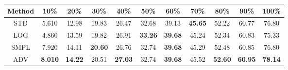 \documentclass{standalone}
\begin{document}
\begin{tabular}{c|cccccccccc}
      \toprule
      Method & 10\% & 20\% & 30\% & 40\% & 50\% & 60\% & 70\% & 80\% & 90\% & 100\% \\
      \midrule
STD & 5.610 & 12.98 & 19.83 & 26.47 & 32.68 & 39.13 & \textbf{45.65} & 52.22 & 60.77 & 76.80\\
LOG & 4.860 & 13.59 & 19.82 & 26.91 & \textbf{33.26} & \textbf{39.68} & 45.24 & 52.34 & 60.83 & 75.33\\
SMPL & 7.920 & 14.11 & \textbf{20.60} & 26.76 & 32.74 & \textbf{39.68} & 45.29 & 52.48 & 60.85 & 76.80\\
ADV & \textbf{8.010} & \textbf{14.22} & 20.51 & \textbf{27.03} & 32.74 & \textbf{39.68} & 45.52 & \textbf{52.60} & \textbf{60.95} & \textbf{78.14}\\
  \bottomrule
\end{tabular}
\end{document}
